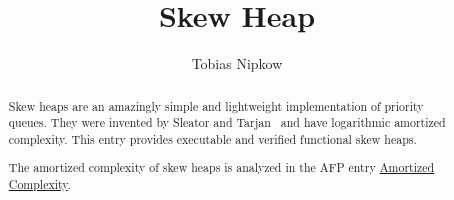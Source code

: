 \documentclass[11pt,a4paper]{article}
\begin{document}
\title{Skew Heap}
\author{Tobias Nipkow}
\maketitle

\begin{abstract}
  Skew heaps are an amazingly simple and lightweight implementation of
  priority queues. They were invented by Sleator and
  Tarjan~\cite{SleatorT-SIAM86} and have logarithmic amortized complexity.
  This entry provides executable and verified functional skew heaps.

The amortized complexity of skew heaps is analyzed in the AFP entry
\href{http://afp.sourceforge.net/entries/Amortized_Complexity.shtml}{Amortized Complexity}.
\end{abstract}

\tableofcontents





\end{document}
